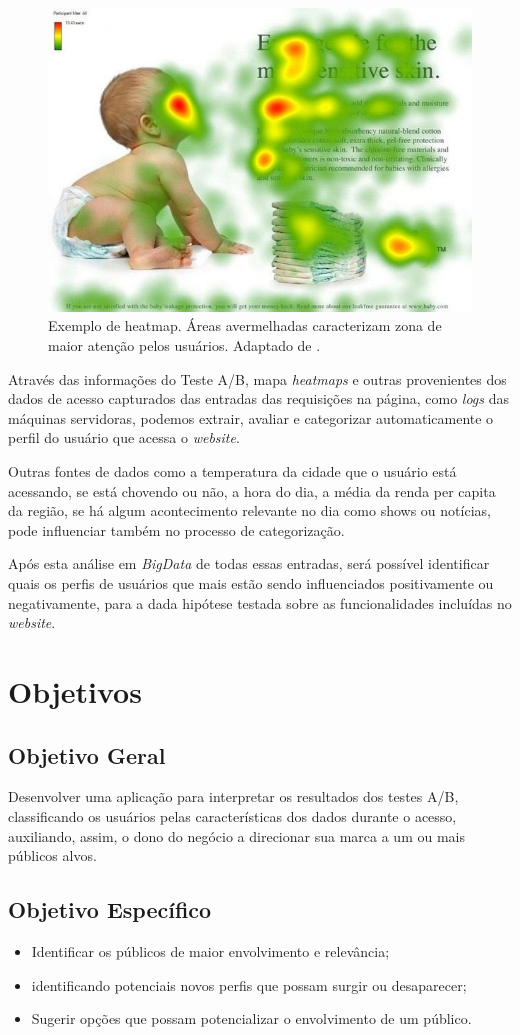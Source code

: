 \documentclass[12pt]{article}
\begin{document}
\begin{figure}[ht]
\centering
\includegraphics[width=.5\textwidth]{fig1.jpg}
\caption{Exemplo de heatmap. Áreas avermelhadas caracterizam zona de maior atenção pelos usuários. Adaptado de \cite{goward:13}.}
\label{fig:heatmap1}
\end{figure}

Através das informações do Teste A/B, mapa \textit{heatmaps} e outras provenientes dos dados de acesso capturados das entradas das requisições na página, como \textit{logs} das máquinas servidoras, podemos extrair, avaliar e categorizar automaticamente o perfil do usuário que acessa o \textit{website}.

Outras fontes de dados como a temperatura da cidade que o usuário está acessando, se está chovendo ou não, a hora do dia, a média da renda per capita da região, se há algum acontecimento relevante no dia como shows ou notícias, pode influenciar também no processo de categorização.

Após esta análise em \textit{BigData} de todas essas entradas, será possível identificar quais os perfis de usuários que mais estão sendo influenciados positivamente ou negativamente, para a dada hipótese testada sobre as funcionalidades incluídas no \textit{website}.

\section{Objetivos}
\subsection{Objetivo Geral}
Desenvolver uma aplicação para interpretar os resultados dos testes A/B, classificando os usuários pelas características dos dados durante o acesso, auxiliando, assim, o dono do negócio a direcionar sua marca a um ou mais públicos alvos.

\subsection{Objetivo Específico}
\begin{itemize}
\item Identificar os públicos de maior envolvimento e relevância;
\item identificando potenciais novos perfis que possam surgir ou desaparecer;
\item Sugerir opções que possam potencializar o envolvimento de um público.
\end{itemize}
\end{document}
